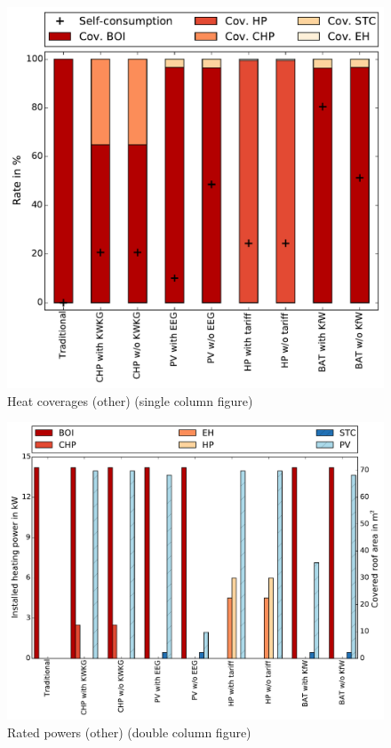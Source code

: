 \begin{figure}[h!]
	\begin{center}
		\includegraphics[width=\linewidth]{figures/plot_coverage_other.pdf}
		\caption{Heat coverages (other) (single column figure)}
		\label{fig: heat coverage other}
	\end{center}
\end{figure}



\begin{figure}[H!]
	\begin{center}
		\includegraphics[width=\textwidth]{figures/plot_cap_gen_other.pdf}
		\caption{Rated powers (other) (double column figure)}
		\label{fig: heat generation other}
	\end{center}
\end{figure}
